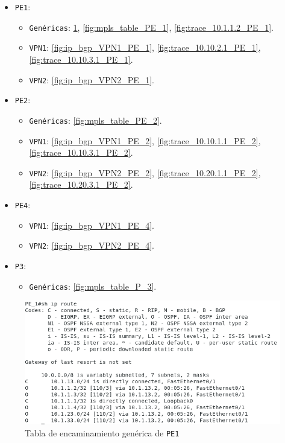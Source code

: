 \documentclass[11pt]{article}
\begin{document}
            \begin{itemize}
                \item \texttt{PE1}:
                    \begin{itemize}
                        \item \texttt{Genéricas}: \ref{fig:ip_route_PE_1}, \ref{fig:mpls_table_PE_1}, \ref{fig:trace_10.1.1.2_PE_1}.
                        \item \texttt{VPN1}: \ref{fig:ip_bgp_VPN1_PE_1}, \ref{fig:trace_10.10.2.1_PE_1}, \ref{fig:trace_10.10.3.1_PE_1}.
                        \item \texttt{VPN2}: \ref{fig:ip_bgp_VPN2_PE_1}.
                    \end{itemize}
                \item \texttt{PE2}:
                    \begin{itemize}
                        \item \texttt{Genéricas}: \ref{fig:mpls_table_PE_2}.
                        \item \texttt{VPN1}: \ref{fig:ip_bgp_VPN1_PE_2}, \ref{fig:trace_10.10.1.1_PE_2}, \ref{fig:trace_10.10.3.1_PE_2}.
                        \item \texttt{VPN2}: \ref{fig:ip_bgp_VPN2_PE_2}, \ref{fig:trace_10.20.1.1_PE_2}, \ref{fig:trace_10.20.3.1_PE_2}.
                    \end{itemize}
                \item \texttt{PE4}:
                    \begin{itemize}
                        \item \texttt{VPN1}: \ref{fig:ip_bgp_VPN1_PE_4}.
                        \item \texttt{VPN2}: \ref{fig:ip_bgp_VPN2_PE_4}.
                    \end{itemize}
                \item \texttt{P3}:
                    \begin{itemize}
                        \item \texttt{Genéricas}: \ref{fig:mpls_table_P_3}.
                    \end{itemize}
            \end{itemize}

            \begin{figure}
                \centering
                \includegraphics[width=0.6\linewidth]{ip_route_PE_1.png}
                \caption{Tabla de encaminamiento genérica de \texttt{PE1}}
                \label{fig:ip_route_PE_1}
            \end{figure}
\end{document}
